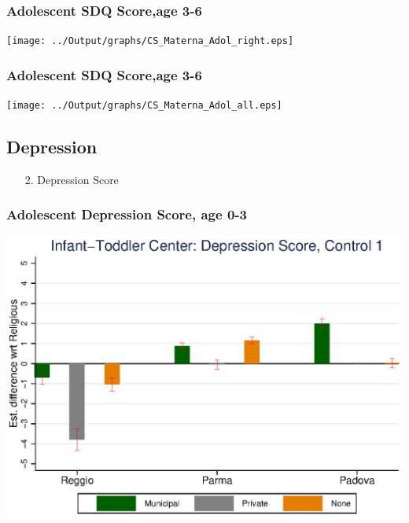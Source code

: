 \documentclass{beamer}
\begin{document}
\begin{frame}\frametitle{Adolescent SDQ Score,age 3-6}
\center
\texttt{[image: ../Output/graphs/CS\_Materna\_Adol\_right.eps]}
\end{frame}

\begin{frame}\frametitle{Adolescent SDQ Score,age 3-6}
\center
\texttt{[image: ../Output/graphs/CS\_Materna\_Adol\_all.eps]}
\end{frame}


\subsection{Depression}
\begin{frame}
\begin{itemize}
	\centering
	\item[2.] Depression Score
\end{itemize}
\end{frame}

\begin{frame}\frametitle{Adolescent Depression Score, age 0-3}
\center
\includegraphics[scale=0.7]{../Output/graphs/D_Asilo_Adol_main.eps}
\end{frame}
\end{document}
